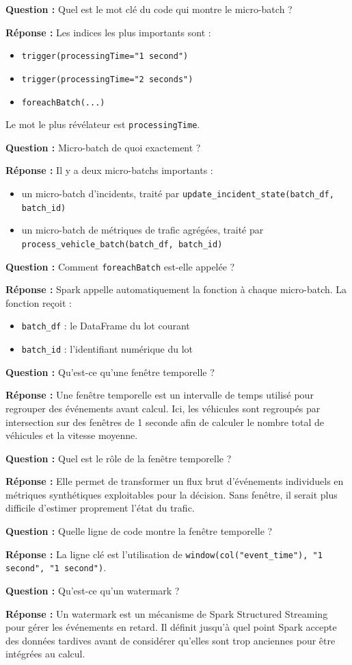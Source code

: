 \documentclass[11pt,a4paper]{article}
\newcommand{\question}[1]{
  \begin{questionbox}
  \textbf{Question :} #1
  \end{questionbox}
}
\newcommand{\reponse}{\textbf{Réponse : }}
\begin{document}
\question{Quel est le mot clé du code qui montre le micro-batch ?}
\reponse Les indices les plus importants sont :
\begin{itemize}[leftmargin=1.4em]
  \item \texttt{trigger(processingTime="1 second")}
  \item \texttt{trigger(processingTime="2 seconds")}
  \item \texttt{foreachBatch(...)}
\end{itemize}
Le mot le plus révélateur est \texttt{processingTime}.

\question{Micro-batch de quoi exactement ?}
\reponse Il y a deux micro-batchs importants :
\begin{itemize}[leftmargin=1.4em]
  \item un micro-batch d'incidents, traité par \texttt{update\_incident\_state(batch\_df, batch\_id)}
  \item un micro-batch de métriques de trafic agrégées, traité par \texttt{process\_vehicle\_batch(batch\_df, batch\_id)}
\end{itemize}

\question{Comment \texttt{foreachBatch} est-elle appelée ?}
\reponse Spark appelle automatiquement la fonction à chaque micro-batch. La fonction reçoit :
\begin{itemize}[leftmargin=1.4em]
  \item \texttt{batch\_df} : le DataFrame du lot courant
  \item \texttt{batch\_id} : l'identifiant numérique du lot
\end{itemize}

\question{Qu'est-ce qu'une fenêtre temporelle ?}
\reponse Une fenêtre temporelle est un intervalle de temps utilisé pour regrouper des événements avant calcul. Ici, les véhicules sont regroupés par intersection sur des fenêtres de 1 seconde afin de calculer le nombre total de véhicules et la vitesse moyenne.

\question{Quel est le rôle de la fenêtre temporelle ?}
\reponse Elle permet de transformer un flux brut d'événements individuels en métriques synthétiques exploitables pour la décision. Sans fenêtre, il serait plus difficile d'estimer proprement l'état du trafic.

\question{Quelle ligne de code montre la fenêtre temporelle ?}
\reponse La ligne clé est l'utilisation de \texttt{window(col("event\_time"), "1 second", "1 second")}.

\question{Qu'est-ce qu'un watermark ?}
\reponse Un watermark est un mécanisme de Spark Structured Streaming pour gérer les événements en retard. Il définit jusqu'à quel point Spark accepte des données tardives avant de considérer qu'elles sont trop anciennes pour être intégrées au calcul.
\end{document}
